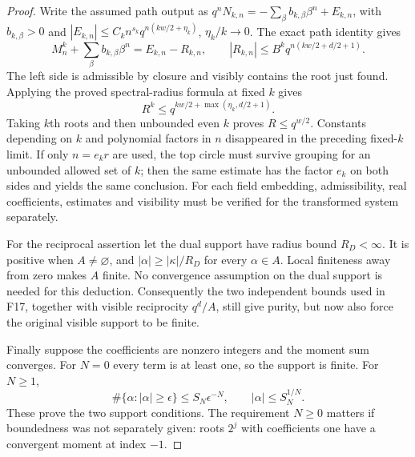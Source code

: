 \documentclass[11pt,a4paper]{article}
\newcommand{\fid}[1]{\textsf{#1}}\newcommand{\gate}[1]{\textsf{#1}}
\theoremstyle{named}\newtheorem{finding}{Finding}[section]
\theoremstyle{definition}\newtheorem{definition}[finding]{Definition}
\theoremstyle{remark}\newtheorem{remark}[finding]{Remark}
\begin{document}
\begin{proof}
Write the assumed path output as
$q^nN_{k,n}=-\sum_\beta b_{k,\beta}\beta^n+E_{k,n}$, with
$b_{k,\beta}>0$ and
$|E_{k,n}|\le C_kn^{s_k}q^{n(kw/2+\eta_k)}$,
$\eta_k/k\to0$. The exact path identity gives
\[
 M_n^k+\sum_\beta b_{k,\beta}\beta^n=E_{k,n}-R_{k,n},\qquad
 |R_{k,n}|\le B^kq^{n(kw/2+d/2+1)}.
\]
The left side is admissible by closure and visibly contains the root
just found. Applying the proved spectral-radius formula at fixed $k$
gives
\[
 R^k\le q^{kw/2+\max(\eta_k,d/2+1)}.
\]
Taking $k$th roots and then unbounded even $k$ proves
$R\le q^{w/2}$. Constants depending on $k$ and polynomial factors
in $n$ disappeared in the preceding fixed-$k$ limit. If only
$n=e_kr$ are used, the top circle must survive grouping for an unbounded
allowed set of $k$; then the same estimate has the factor $e_k$ on
both sides and yields the same conclusion. For each field embedding,
admissibility, real coefficients, estimates and visibility must be
verified for the transformed system separately.

For the reciprocal assertion let the dual support have radius bound
$R_D<\infty$. It is positive when $A\ne\varnothing$, and
$|\alpha|\ge |\kappa|/R_D$ for every $\alpha\in A$.
Local finiteness away from zero makes $A$ finite. No convergence
assumption on the dual support is needed for this deduction.
Consequently the two independent bounds used in \fid{F17}, together
with visible reciprocity $q^d/A$, still give purity, but now also
force the original visible support to be finite.

Finally suppose the coefficients are nonzero integers and the moment
sum converges. For $N=0$ every term is at least one, so the support is
finite. For $N\ge1$,
\[
 \#\{\alpha:|\alpha|\ge\epsilon\}\le S_N\epsilon^{-N},\qquad
 |\alpha|\le S_N^{1/N}.
\]
These prove the two support conditions. The requirement $N\ge0$
matters if boundedness was not separately given: roots $2^j$ with
coefficients one have a convergent moment at index $-1$.
\end{proof}
\end{document}
